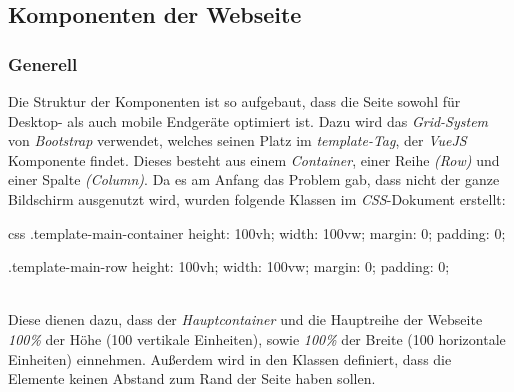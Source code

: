 \newpage
\subsection{Komponenten der Webseite}
\label{chapter:implementierung-frontend-komponenten}
\subsubsection{Generell}
\label{chapter:implementierung-frontend-komponenten-generell}
Die Struktur der Komponenten ist so aufgebaut, dass die Seite sowohl für Desktop- als auch mobile Endgeräte optimiert ist. Dazu wird das \textit{Grid-System} von \textit{Bootstrap} verwendet, welches seinen Platz im \textit{template-Tag}, der \textit{VueJS} Komponente findet. Dieses besteht aus einem \textit{Container}, einer Reihe \textit{(Row)} und einer Spalte \textit{(Column)}. Da es am Anfang das Problem gab, dass nicht der ganze Bildschirm ausgenutzt wird, wurden folgende Klassen im \textit{CSS}-Dokument erstellt:
\begin{code}{css}
	.template-main-container {
		height: 100vh;
		width: 100vw;
		margin: 0;
		padding: 0;
	}
	
	.template-main-row {
		height: 100vh;
		width: 100vw;
		margin: 0;
		padding: 0;
	}
\end{code}
	\label{list:cssmaincont} ~\\
Diese dienen dazu, dass der \textit{Hauptcontainer} und die Hauptreihe der Webseite \textit{100\%} der Höhe (100 vertikale Einheiten), sowie \textit{100\%} der Breite (100 horizontale Einheiten) einnehmen. Außerdem wird in den Klassen definiert, dass die Elemente keinen Abstand zum Rand der Seite haben sollen.
\newpage
